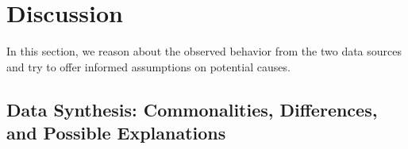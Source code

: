\section{Discussion}
\label{sec:discussion}
In this section, we reason about the observed behavior from the two data sources and try to offer
informed assumptions on potential causes.


\subsection{Data Synthesis: Commonalities, Differences, and Possible Explanations}
\label{subsec:data-synthesis:-commonalities-differences-and-possible-explanations}

